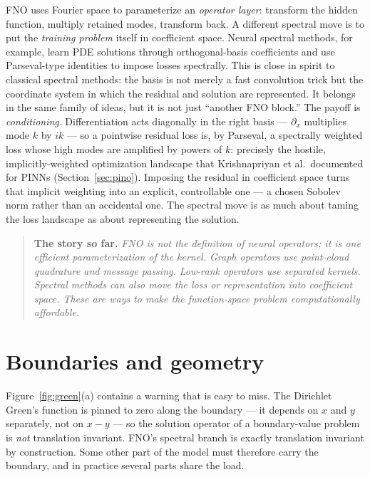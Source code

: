 \documentclass[10pt,a4paper]{article}
\newenvironment{recap}
{\par\medskip\noindent\begin{quote}\small\textbf{The story so far.}\itshape\;}
{\end{quote}\medskip}
\begin{document}
FNO uses Fourier space to parameterize an \emph{operator layer}: transform the
hidden function, multiply retained modes, transform back. A different spectral
move is to put the \emph{training problem} itself in coefficient space. Neural
spectral methods, for example, learn PDE solutions through orthogonal-basis
coefficients and use Parseval-type identities to impose losses spectrally.
This is close in spirit to classical spectral methods: the basis is not merely
a fast convolution trick but the coordinate system in which the residual and
solution are represented. It belongs in the same family of ideas, but it is
not just ``another FNO block.'' The payoff is \emph{conditioning}.
Differentiation acts diagonally in the right basis --- $\partial_x$
multiplies mode $k$ by $ik$ --- so a pointwise residual loss is, by
Parseval, a spectrally weighted loss whose high modes are amplified by
powers of $k$: precisely the hostile, implicitly-weighted optimization
landscape that Krishnapriyan et al.\ documented for PINNs
(Section~\ref{sec:pino}). Imposing the residual in coefficient space
turns that implicit weighting into an explicit, controllable one --- a
chosen Sobolev norm rather than an accidental one. The spectral move is
as much about taming the loss landscape as about representing the
solution.

\begin{recap}
FNO is not the definition of neural operators; it is one efficient
parameterization of the kernel. Graph operators use point-cloud quadrature and
message passing. Low-rank operators use separated kernels. Spectral methods
can also move the loss or representation into coefficient space. These are
ways to make the function-space problem computationally affordable.
\end{recap}

\section{Boundaries and geometry}
\label{sec:boundary}

Figure~\ref{fig:green}(a) contains a warning that is easy to miss. The
Dirichlet Green's function is pinned to zero along the boundary --- it
depends on $x$ and $y$ separately, not on $x - y$ --- so the solution
operator of a boundary-value problem is \emph{not} translation invariant.
FNO's spectral branch is exactly translation invariant by construction.
Some other part of the model must therefore carry the boundary, and in
practice several parts share the load.
\end{document}
